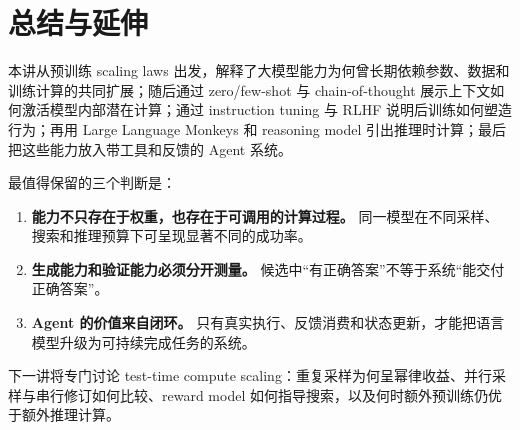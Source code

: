 \section{总结与延伸}

本讲从预训练 scaling laws 出发，解释了大模型能力为何曾长期依赖参数、数据和训练计算的共同扩展；随后通过 zero/few-shot 与 chain-of-thought 展示上下文如何激活模型内部潜在计算；通过 instruction tuning 与 RLHF 说明后训练如何塑造行为；再用 Large Language Monkeys 和 reasoning model 引出推理时计算；最后把这些能力放入带工具和反馈的 Agent 系统。

最值得保留的三个判断是：

\begin{enumerate}
    \item \textbf{能力不只存在于权重，也存在于可调用的计算过程。} 同一模型在不同采样、搜索和推理预算下可呈现显著不同的成功率。
    \item \textbf{生成能力和验证能力必须分开测量。} 候选中“有正确答案”不等于系统“能交付正确答案”。
    \item \textbf{Agent 的价值来自闭环。} 只有真实执行、反馈消费和状态更新，才能把语言模型升级为可持续完成任务的系统。
\end{enumerate}

下一讲将专门讨论 test-time compute scaling：重复采样为何呈幂律收益、并行采样与串行修订如何比较、reward model 如何指导搜索，以及何时额外预训练仍优于额外推理计算。


